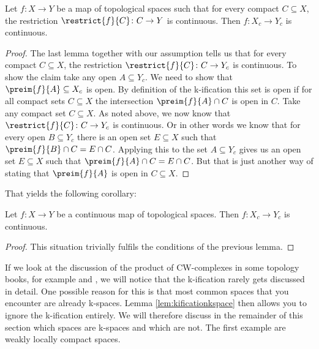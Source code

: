 \begin{lem}\label{lem:continuousofcontinuousoncompact}
    Let $f \colon X \to Y$ be a map of topological spaces such that for every compact $C \subseteq X$, the restriction $\restrict{f}{C} \colon C \to Y$ is continuous.
    Then $f \colon X_c \to Y_c$ is continuous.
    \href{https://github.com/scholzhannah/CWComplexes/blob/7be4872a05b534011cc969eb5b80a4b7f0bf57e2/CWcomplexes/KSpace.lean#L303-L316}{\faExternalLink}
\end{lem}
\begin{proof}
    The last lemma together with our assumption tells us that for every compact $C \subseteq X$, the restriction $\restrict{f}{C} \colon C \to Y_c$ is continuous.
    To show the claim take any open $A \subseteq Y_c$.
    We need to show that $\preim{f}{A} \subseteq X_c$ is open. 
    By definition of the k-ification this set is open if for all compact sets $C \subseteq X$ the intersection $\preim{f}{A} \cap C$ is open in $C$. 
    Take any compact set $C \subseteq X$. 
    As noted above, we now know that $\restrict{f}{C} \colon C \to Y_c$ is continuous.
    Or in other words we know that for every open $B \subseteq Y_c$ there is an open set $E \subseteq X$ such that $\preim{f}{B} \cap C = E \cap C$.
    Applying this to the set $A \subseteq Y_c$ gives us an open set $E \subseteq X$ such that $\preim{f}{A} \cap C = E \cap C$.
    But that is just another way of stating that $\preim{f}{A}$ is open in $C \subseteq X$.
\end{proof}

That yields the following corollary: 

\begin{cor}
    Let $f \colon X \to Y$ be a continuous map of topological spaces.
    Then $f \colon X_c \to Y_c$ is continuous.
    \href{https://github.com/scholzhannah/CWComplexes/blob/7be4872a05b534011cc969eb5b80a4b7f0bf57e2/CWcomplexes/KSpace.lean#L318-L323}{\faExternalLink}
\end{cor}
\begin{proof}
    This situation trivially fulfils the conditions of the previous lemma.
\end{proof}

If we look at the discussion of the product of CW-complexes in some topology books, for example \cite{Hatcher2001} and \cite{Lück2005}, we will notice that the k-ification rarely gets discussed in detail. 
One possible reason for this is that most common spaces that you encounter are already k-spaces.
Lemma \ref{lem:kificationkspace} then allows you to ignore the k-ification entirely. 
We will therefore discuss in the remainder of this section which spaces are k-spaces and which are not.
The first example are weakly locally compact spaces.

